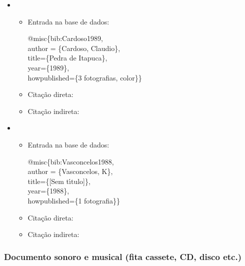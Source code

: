 \documentclass[a4paper,12pt,oneside,onecolumn]{uerj}
\newcommand{\formato}[1]{\begin{flushleft}{#1}\end{flushleft}}
\begin{document}
\begin{itemize}[label={Ex.:},leftmargin=\parindent,parsep=0pt,itemsep=0pt]
  \item     \formato{\citetext{bib:Cardoso1989}}

  \begin{itemize}[leftmargin=*,parsep=0pt,itemsep=0pt]
    \item Entrada na base de dados:

    \formato{
      @misc\{bib:Cardoso1989,\\
      author = \{Cardoso, Claudio\},\\
      title=\{Pedra de Itapuca\},\\
      year=\{1989\},\\
      howpublished=\{3 fotografias, color\}\}\\
    }

    \item Citação direta: 
    \item Citação indireta: \cite{bib:Cardoso1989}\\
  \end{itemize}

  \item     \formato{\citetext{bib:Vasconcelos1988}}

  \begin{itemize}[leftmargin=*,parsep=0pt,itemsep=0pt]
    \item Entrada na base de dados:

    \formato{
      @misc\{bib:Vasconcelos1988,\\
      author = \{Vasconcelos, K\},\\
      title=\{[Sem t{\'\i}tulo]\},\\
      year=\{1988\},\\
      howpublished=\{1 fotografia\}\}\\
    }

    \item Citação direta: 
    \item Citação indireta: \cite{bib:Vasconcelos1988}
  \end{itemize}
\end{itemize}

\subsubsection{Documento sonoro e musical (fita cassete, CD, disco etc.)}
\end{document}
